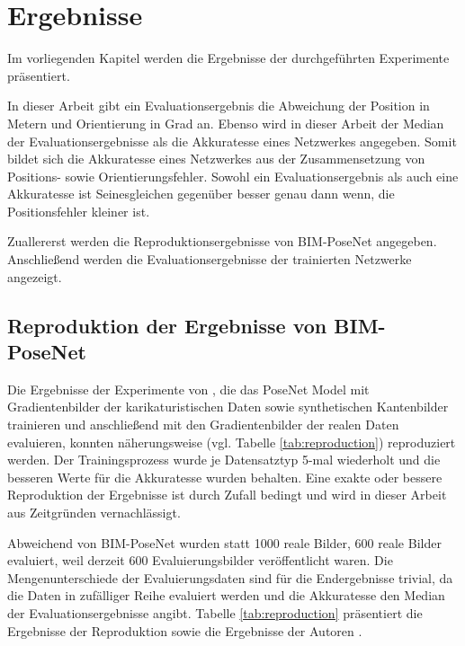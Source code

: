 
\section{Ergebnisse}
Im vorliegenden Kapitel werden die Ergebnisse der durchgeführten Experimente präsentiert.

In dieser Arbeit gibt ein Evaluationsergebnis die Abweichung der Position in Metern und Orientierung in Grad an. Ebenso wird in dieser Arbeit der Median der Evaluationsergebnisse als die Akkuratesse eines Netzwerkes angegeben. Somit bildet sich die Akkuratesse eines Netzwerkes aus der Zusammensetzung von Positions-  sowie Orientierungsfehler. Sowohl ein Evaluationsergebnis als auch eine Akkuratesse ist Sei­nes­glei­chen gegenüber besser genau dann wenn, die Positionsfehler kleiner ist.

Zuallererst werden die Reproduktionsergebnisse von BIM-PoseNet \cite{acharyaBIMPoseNetIndoorCamera2019} angegeben. Anschließend werden die Evaluationsergebnisse der trainierten Netzwerke angezeigt.

\subsection{Reproduktion der Ergebnisse von BIM-PoseNet}
Die Ergebnisse der Experimente von \citet{acharyaBIMPoseNetIndoorCamera2019}, die das PoseNet Model mit Gradientenbilder der karikaturistischen Daten sowie synthetischen Kantenbilder trainieren und anschließend mit den Gradientenbilder der realen Daten evaluieren, konnten näherungsweise (vgl. Tabelle \ref{tab:reproduction}) reproduziert werden. Der Trainingsprozess wurde je Datensatztyp 5-mal wiederholt und die besseren Werte für die Akkuratesse wurden behalten. Eine exakte oder bessere Reproduktion der Ergebnisse ist durch Zufall bedingt und wird in dieser Arbeit aus Zeitgründen vernachlässigt.

Abweichend von BIM-PoseNet wurden statt 1000 reale Bilder, 600 reale Bilder evaluiert, weil derzeit 600 Evaluierungsbilder veröffentlicht waren. Die Mengenunterschiede der Evaluierungsdaten sind für die Endergebnisse trivial, da die Daten in zufälliger Reihe evaluiert werden und die Akkuratesse den Median der Evaluationsergebnisse angibt. Tabelle \ref{tab:reproduction} präsentiert die Ergebnisse der Reproduktion sowie die Ergebnisse der Autoren \citet{acharyaBIMPoseNetIndoorCamera2019}.


